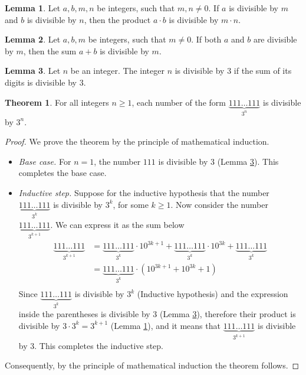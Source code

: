 \documentclass[letterpaper, 10pt]{article}
\theoremstyle{definition}
\newtheorem{lem}{Lemma}
\newtheorem*{thm*}{Theorem}
\begin{document}
\begin{lem}\label{lem:1}
	Let $a,b, m, n$ be integers, such that $m,n \neq 0$.
	If $a$ is divisible by $m$ and $b$ is divisible by $n$, then the product
	$a\cdot b$ is divisible by $m \cdot n$.
\end{lem}

\begin{lem}\label{lem:2}
	Let $a,b,m$ be integers, such that $m \neq 0$. If both $a$ and $b$ are
	divisible by $m$, then the sum $a + b$ is divisible by $m$.
\end{lem}

\begin{lem}\label{div}
	Let $n$ be an integer. The integer $n$ is divisible by $3$ if the sum of its
	digits is divisible by $3$.
\end{lem}

\def\seqone#1{\underbrace{111\ldots111}_{3^{#1}}}

\begin{thm*}
	For all integers $n \ge 1$, each number of the form
	$\underbrace{111\ldots111}_{3^n}$ is divisible by $3^n$.
\end{thm*}

\begin{proof} We prove the theorem by the principle of mathematical induction.
	\begin{itemize}[wide, labelwidth=!, labelindent=0pt]
	\item \emph{Base case.}\quad
		For $n = 1$, the number $111$ is divisible by $3$ (Lemma \ref{div}). This
		completes the base case.
	\item \emph{Inductive step.}\quad
		Suppose for the inductive hypothesis that the number
		$\underbrace{111\ldots111}_{3^k}$ is divisible by $3^k$, for some $k \ge
		1$. Now consider the number $\underbrace{111\ldots111}_{3^{k+1}}$.
		We can express it as the sum below 
	\begin{align*}
		\seqone{k+1} &= \seqone{k} \cdot 10^{3k+1} + \seqone{k} \cdot 10^{3k} +
		\seqone{k}\\
		&= \seqone{k} \cdot (10^{3k+1} + 10^{3k} + 1)\\
	\end{align*}
			Since $\seqone{k}$ is divisible by $3^k$ (Inductive hypothesis) and the
		expression inside the parentheses is divisible by $3$ (Lemma
			\ref{div}), therefore their product is divisible by $3 \cdot 3^k =
			3^{k+1}$ (Lemma \ref{lem:1}), and it means that $\seqone{k+1}$ is
			divisible by $3$. This completes the inductive step.
\end{itemize}
	Consequently, by the principle of mathematical induction the theorem follows.
\end{proof}
\end{document}
